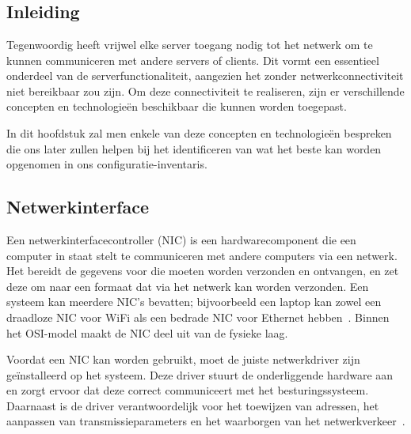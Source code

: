
\chapter{}%
\label{ch:computernetwerk-concepten}

\section{Inleiding}
\label{netwerk_inleiding}

Tegenwoordig heeft vrijwel elke server toegang nodig tot het netwerk om te kunnen communiceren met andere servers of clients.
Dit vormt een essentieel onderdeel van de serverfunctionaliteit, aangezien het zonder netwerkconnectiviteit niet bereikbaar zou zijn.
Om deze connectiviteit te realiseren, zijn er verschillende concepten en technologie\"en beschikbaar die kunnen worden toegepast.

In dit hoofdstuk zal men enkele van deze concepten en technologie\"en bespreken die ons later zullen helpen bij het identificeren van wat het beste kan worden opgenomen in ons configuratie-inventaris.

\section{Netwerkinterface}
\label{netwerk_netwerkinterface}

Een netwerkinterfacecontroller (NIC) is een hardwarecomponent die een computer in staat stelt te communiceren met andere computers via een netwerk.
Het bereidt de gegevens voor die moeten worden verzonden en ontvangen, en zet deze om naar een formaat dat via het netwerk kan worden verzonden.
Een systeem kan meerdere NIC's bevatten; bijvoorbeeld een laptop kan zowel een draadloze NIC voor WiFi als een bedrade NIC voor Ethernet hebben~\autocite{hypponen2021securing}.
Binnen het OSI-model maakt de NIC deel uit van de fysieke laag.

Voordat een NIC kan worden gebruikt, moet de juiste netwerkdriver zijn geïnstalleerd op het systeem.
Deze driver stuurt de onderliggende hardware aan en zorgt ervoor dat deze correct communiceert met het besturingssysteem.
Daarnaast is de driver verantwoordelijk voor het toewijzen van adressen, het aanpassen van transmissieparameters en het waarborgen van het netwerkverkeer~\autocite{hypponen2021securing}.

